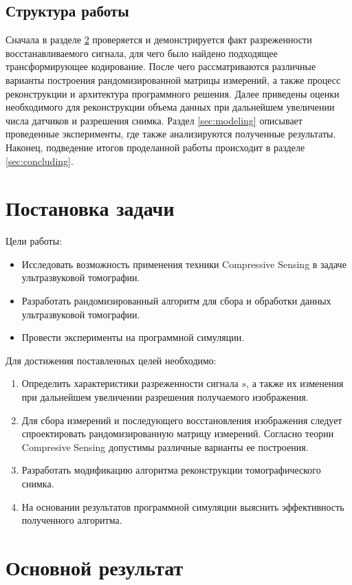 \documentclass[14pt]{matmex-diploma-custom}
\begin{document}
\subsection{Структура работы}
Сначала в разделе \ref{sec:main_result} проверяется и демонстрируется факт разреженности восстанавливаемого сигнала, для чего было найдено подходящее трансформирующее кодирование. После чего рассматриваются различные варианты построения рандомизированной матрицы измерений, а также процесс реконструкции и архитектура программного решения. Далее приведены оценки необходимого для реконструкции объема данных при дальнейшем увеличении числа датчиков и разрешения снимка. Раздел \ref{sec:modeling} описывает проведенные эксперименты, где также анализируются полученные результаты. Наконец, подведение итогов проделанной работы происходит в разделе \ref{sec:concluding}.

\section{Постановка задачи}
Цели работы:
\begin{itemize}
  \item Исследовать возможность применения техники Compres\-sive Sen\-sing в задаче ультразвуковой томографии.
  \item Разработать рандомизированный алгоритм для сбора и обработки данных ультразвуковой томографии.
  \item Провести эксперименты на программной симуляции.
\end{itemize}

Для достижения поставленных целей необходимо:
\begin{enumerate}
\item Определить характеристики разреженности сигнала $s$, а также их изменения при дальнейшем увеличении разрешения получаемого изображения.
\item Для сбора измерений и последующего восстановления изображения следует спроектировать рандомизированную матрицу измерений. Согласно теории Compresive Sensing допустимы различные варианты ее построения.
\item Разработать модификацию алгоритма реконструкции томографического снимка.
\item На основании результатов программной симуляции выяснить эффективность полученного алгоритма.
\end{enumerate}



\section{Основной результат} \label{sec:main_result}
\end{document}
